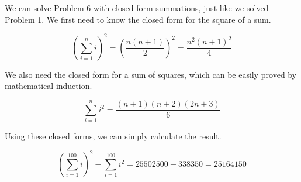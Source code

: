 \documentclass{article}
\begin{document}
We can solve Problem 6 with closed form summations, just like we solved Problem 1. We first need to know the closed form for the square of a sum.

\[ \left(\sum_{i=1}^n i\right)^2 = \left(\frac{n(n+1)}{2}\right)^2 = \frac{n^2(n+1)^2}{4} \]

We also need the closed form for a sum of squares, which can be easily proved by mathematical induction.

\[ \sum_{i=1}^n i^2 = \frac{(n+1)(n+2)(2n+3)}{6} \]

Using these closed forms, we can simply calculate the result.

\[  \left(\sum_{i=1}^{100} i\right)^2 - \sum_{i=1}^{100} i^2 = 25502500 - 338350 = 25164150 \]
\end{document}
